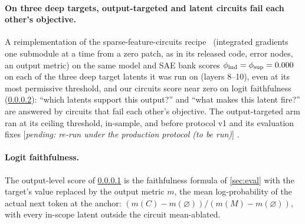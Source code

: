 \documentclass[10pt]{article}
\newif\ifexternal
\DeclareRobustCommand{\pending}[1]{%
  \ifexternal
    \ifvmode\textcolor{black!55}{[to be added]}\else\unskip\fi
  \else
    \textcolor{red!70!black}{[\textit{pending: #1}]}%
  \fi}
\begin{document}
\paragraph{On three deep targets, output-targeted and latent circuits fail each other's objective.}
\label{sec:sfc-boundary}
A reimplementation of the sparse-feature-circuits recipe~\citep{marks2025sparse} (integrated gradients one submodule at a time from a zero patch, as in its released code, error nodes, an output metric) on the same model and SAE bank scores $\phi_{\mathrm{ind}} = \phi_{\mathrm{sup}} = 0.000$ on each of the three deep target latents it was run on (layers 8--10), even at its most permissive threshold, and our circuits score near zero on logit faithfulness (\cref{app:logit-faith}): ``which latents support this output?'' and ``what makes this latent fire?'' are answered by circuits that fail each other's objective.
The output-targeted arm ran at its ceiling threshold, in-sample, and before protocol v1 and its evaluation fixes \pending{re-run under the production protocol (to be run)}.

\paragraph{Logit faithfulness.}
\label{app:logit-faith}
The output-level score of \cref{sec:sfc-boundary} is the faithfulness formula of \cref{sec:eval} with the target's value replaced by the output metric $m$, the mean log-probability of the actual next token at the anchor: $(m(C) - m(\varnothing)) / (m(M) - m(\varnothing))$, with every in-scope latent outside the circuit mean-ablated.

\end{document}

